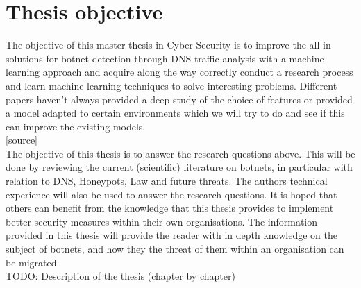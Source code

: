\section{Thesis objective}
The objective of this master thesis in Cyber Security is to improve the all-in solutions for botnet detection through DNS traffic analysis with a machine learning approach and acquire along the way correctly conduct a research process and learn machine learning techniques to solve interesting problems. Different papers haven't always provided a deep study of the choice of features or provided a model adapted to certain environments which we will try to do and see if this can improve the existing models.\\

[source]\\
The objective of this thesis is to answer the research questions above. This will be done by reviewing the current (scientific) literature on botnets, in particular with relation to DNS, Honeypots, Law and future threats. The authors technical experience will also be used to answer the research questions. It is hoped that others can benefit from the knowledge that this thesis provides to implement
better security measures within their own organisations. The information provided in this thesis will provide the reader with in depth knowledge on the subject of botnets, and how they the threat of them within an organisation can be migrated.
\\
TODO: Description of the thesis (chapter by chapter)

